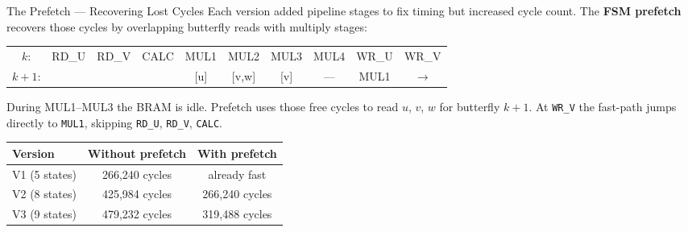 \documentclass[aspectratio=169, 11pt]{beamer}
\begin{document}
\begin{frame}{The Prefetch --- Recovering Lost Cycles}
Each version added pipeline stages to fix timing but increased cycle count. The \textbf{FSM prefetch} recovers those cycles by overlapping butterfly reads with multiply stages:

\vspace{0.3em}
\begin{center}
\ttfamily\scriptsize
\begin{tabular}{cccccccccc}
$k$:   & RD\_U & RD\_V & CALC & MUL1 & MUL2 & MUL3 & MUL4 & WR\_U & WR\_V \\
$k{+}1$: & & & & [u] & [v,w] & [v] & --- & MUL1 & $\to$ \\
\end{tabular}
\end{center}

\vspace{0.3em}
During MUL1--MUL3 the BRAM is idle. Prefetch uses those free cycles to read $u$, $v$, $w$ for butterfly $k+1$. At \texttt{WR\_V} the fast-path jumps directly to \texttt{MUL1}, skipping \texttt{RD\_U}, \texttt{RD\_V}, \texttt{CALC}.

\vspace{0.3em}
\begin{center}
\small
\begin{tabular}{lcc}
\toprule
\textbf{Version} & \textbf{Without prefetch} & \textbf{With prefetch} \\
\midrule
V1 (5 states) & 266,240 cycles & already fast \\
V2 (8 states) & 425,984 cycles & 266,240 cycles \\
V3 (9 states) & 479,232 cycles & 319,488 cycles \\
\bottomrule
\end{tabular}
\end{center}
\end{frame}
\end{document}
